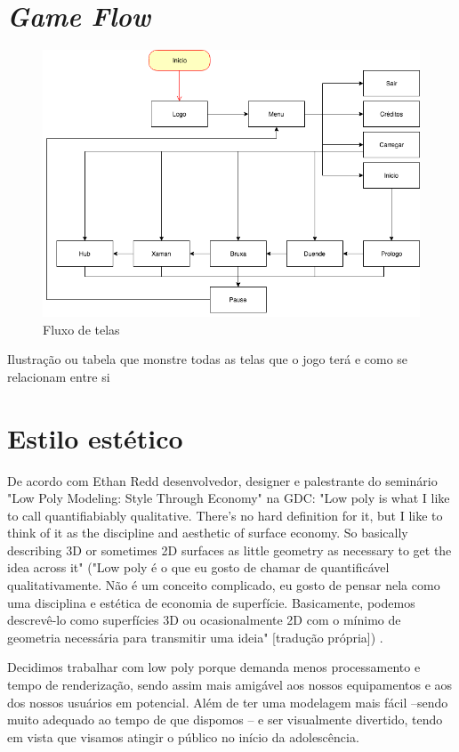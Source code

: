 \section{\textit{Game Flow}}
\begin{figure}[!htb]
	\caption{\label{fig_grafico}Fluxo de telas}
	\begin{center}
	    \includegraphics[width=\textwidth]{imagens/Flow.png}
	\end{center}
\end{figure}
Ilustração ou tabela que monstre todas as telas que o jogo terá e como se relacionam entre si

\section{Estilo estético}
De acordo com Ethan Redd desenvolvedor, designer e palestrante do seminário "Low Poly Modeling: Style Through Economy" na GDC: "Low poly is what I like to call quantifiabiably qualitative. There's no hard definition for it, but I like to think of it as the discipline and aesthetic of surface economy. So basically describing 3D or sometimes 2D surfaces as little geometry as necessary to get the idea across it"  ("Low poly é o que eu gosto de chamar de quantificável qualitativamente. Não é um conceito complicado, eu gosto de pensar nela como uma disciplina e estética de economia de superfície. Basicamente, podemos descrevê-lo como superfícies 3D ou ocasionalmente 2D com o mínimo de geometria necessária para transmitir uma ideia" [tradução própria]) .

Decidimos trabalhar com low poly porque demanda menos processamento e tempo de renderização, sendo assim mais amigável aos nossos equipamentos e aos dos nossos usuários em potencial. Além de ter uma modelagem mais fácil --sendo muito adequado ao tempo de que dispomos -- e ser visualmente divertido, tendo em vista que visamos atingir o público no início da adolescência. 

